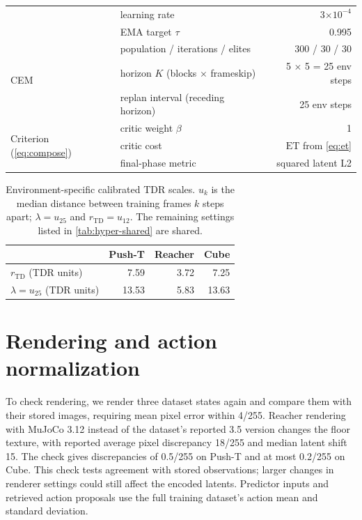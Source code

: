 \documentclass{article}
\newcommand{\Htd}{r_{\mathrm{TD}}}
\newcommand{\ET}{\mathrm{ET}}
\theoremstyle{definition}
\theoremstyle{remark}
\begin{document}
\begin{table}[h]
\begin{tabularx}{\linewidth}{lXr}
 & learning rate & 3$\times10^{-4}$ \\
 & EMA target $\tau$ & 0.995 \\
\midrule
\multirow{3}{*}{CEM}
 & population / iterations / elites & 300 / 30 / 30 \\
 & horizon $K$ (blocks $\times$ frameskip) & 5 $\times$ 5 = 25 env steps \\
 & replan interval (receding horizon) & 25 env steps \\
\midrule
\multirow{3}{*}{Criterion (\cref{eq:compose})}
 & critic weight $\beta$ & 1 \\
 & critic cost & $\ET$ from \cref{eq:et} \\
 & final-phase metric & squared latent L2 \\
\bottomrule
\end{tabularx}
\end{table}
\begin{table}[h]
\centering\small
\caption{Environment-specific calibrated TDR scales. $u_k$ is the median distance between training frames $k$ steps apart; $\lambda=u_{25}$ and $r_{\mathrm{TD}}=u_{12}$. The remaining settings listed in \cref{tab:hyper-shared} are shared.}
\label{tab:hyper-env}
\begin{tabular}{lrrr}
\toprule
& Push-T & Reacher & Cube \\
\midrule
$\Htd$ (TDR units) & 7.59 & 3.72 & 7.25 \\
$\lambda=u_{25}$ (TDR units) & 13.53 & 5.83 & 13.63 \\
\bottomrule
\end{tabular}
\end{table}

\section{Rendering and action normalization}
\label{app:render}
To check rendering, we render three dataset states again and compare them with
their stored images, requiring mean pixel error within 4/255.
Reacher rendering with MuJoCo 3.12 instead of the dataset's reported 3.5 version
changes the floor texture, with reported average pixel discrepancy 18/255 and
median latent shift 15. The check gives discrepancies of 0.5/255 on Push-T
and at most 0.2/255 on Cube.
This check tests agreement with stored observations; larger changes in renderer
settings could still affect the encoded latents.
Predictor inputs and retrieved action proposals use the full training dataset's
action mean and standard deviation.
\end{document}
